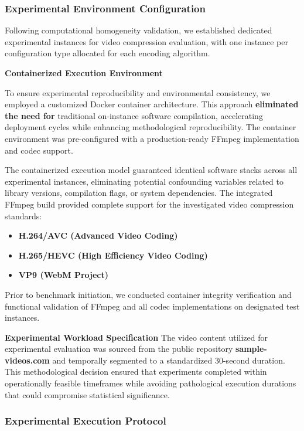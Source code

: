 \documentclass[conference]{IEEEtran}
\begin{document}
	\subsubsection{Experimental Environment Configuration}
	
	Following computational homogeneity validation, we established dedicated experimental instances for video compression evaluation, with one instance per configuration type allocated for each encoding algorithm.
	
	\textbf{Containerized Execution Environment}
	
	To ensure experimental reproducibility and environmental consistency, we employed a customized Docker container architecture. This approach \textbf{eliminated the need for} traditional on-instance software compilation, accelerating deployment cycles while enhancing methodological reproducibility. The container environment was pre-configured with a production-ready FFmpeg implementation and codec support.
	
	The containerized execution model guaranteed identical software stacks across all experimental instances, eliminating potential confounding variables related to library versions, compilation flags, or system dependencies. The integrated FFmpeg build provided complete support for the investigated video compression standards:
	\begin{itemize}
		\item \textbf{H.264/AVC (Advanced Video Coding)}
		\item \textbf{H.265/HEVC (High Efficiency Video Coding)}
		\item \textbf{VP9 (WebM Project)}
	\end{itemize}
	
	Prior to benchmark initiation, we conducted container integrity verification and functional validation of FFmpeg and all codec implementations on designated test instances.
	
	\textbf{Experimental Workload Specification}
	The video content utilized for experimental evaluation was sourced from the public repository \textbf{sample-videos.com} and temporally segmented to a standardized 30-second duration. This methodological decision ensured that experiments completed within operationally feasible timeframes while avoiding pathological execution durations that could compromise statistical significance.
	
	\subsubsection{Experimental Execution Protocol}
	
\end{document}
